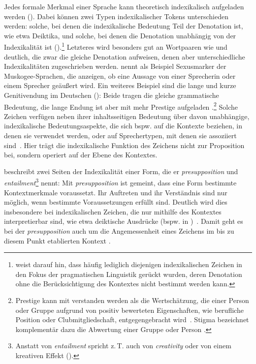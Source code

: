 Jedes formale Merkmal einer Sprache kann theoretisch indexikalisch aufgeladen werden (\cites[s.][42]{Silverstein.1976}[206]{Silverstein1979}). 
Dabei können zwei Typen indexikalischer Tokens unterschieden werden: solche, bei denen die indexikalische Bedeutung Teil der Denotation ist, wie etwa Deiktika, und solche, bei denen die Denotation unabhängig von der Indexikalität ist (\cites[s.][34]{Silverstein.1976}[497]{HessLuttich2005}).\footnote{\citet[3]{Auer.1995} weist darauf hin, dass häufig lediglich diejenigen indexikalischen Zeichen in den Fokus der pragmatischen Linguistik gerückt wurden, deren Denotation ohne die Berücksichtigung des Kontextes nicht bestimmt werden kann.}
Letzteres wird besonders gut an Wortpaaren wie  und  deutlich, die zwar die gleiche Denotation aufweisen, denen aber unterschiedliche Indexikalitäten zugeschrieben werden. 
\citet[30--31]{Silverstein.1976} nennt als Beispiel Sexusmarker der Muskogee-Sprachen, die anzeigen, ob eine Aussage von einer Sprecherin oder einem Sprecher ge{\"a}u{\ss}ert wird.
Ein weiteres Beispiel sind die lange und kurze Genitivendung im Deutschen (): Beide tragen die gleiche grammatische Bedeutung, die lange Endung ist aber mit mehr Prestige aufgeladen \citep[s.][]{Szczepaniak2014}.\footnote{Prestige kann mit \citet{Strasser2005} verstanden werden als {\glqq}die Wertschätzung, die einer Person oder Gruppe aufgrund von positiv bewerteten Eigenschaften, wie berufliche Position oder Clubmitgliedschaft, entgegengebracht wird{\grqq}~\citep[412]{Strasser2005}. Stigma bezeichnet komplementär dazu die Abwertung einer Gruppe oder Person \citep[s.][412]{Strasser2005}.}
Solche Zeichen verfügen neben ihrer inhaltsseitigen Bedeutung über davon unabhängige, indexikalische Bedeutungsaspekte, die sich bspw. auf die Kontexte beziehen, in denen sie verwendet werden, oder auf Sprechertypen, mit denen sie assoziiert sind~\citep[s.][206--207]{Silverstein1979}. 
Hier trägt die indexikalische Funktion des Zeichens nicht zur Proposition bei, sondern operiert auf der Ebene des Kontextes. 

\textcites[33--35]{Silverstein.1976}[195--196]{Silverstein2003} beschreibt zwei Seiten der Indexikalität einer Form, die er \textit{presupposition} und \textit{entailment}\footnote{Anstatt von \textit{entailment} spricht \citeauthor{Silverstein1979} z.\,T. auch von \textit{creativity} oder von einem kreativen Effekt (\cites[s.][]{Silverstein.1976}[]{Silverstein1979}).} nennt: 
Mit \textit{presupposition} ist gemeint, dass eine Form bestimmte Kontextmerkmale voraussetzt. 
Ihr Auftreten und ihr Verständnis sind nur möglich, wenn bestimmte Voraussetzungen erfüllt sind. 
Deutlich wird dies insbesondere bei indexikalischen Zeichen, die nur mithilfe des Kontextes interpretierbar sind, wie etwa deiktische Ausdr{\"u}cke (bspw.  in )~\citep[s.][33]{Silverstein.1976}. 
Damit geht es bei der \textit{presupposition} auch um die Angemessenheit eines Zeichens im bis zu diesem Punkt etablierten Kontext \citep[s.][195]{Silverstein2003}. 

